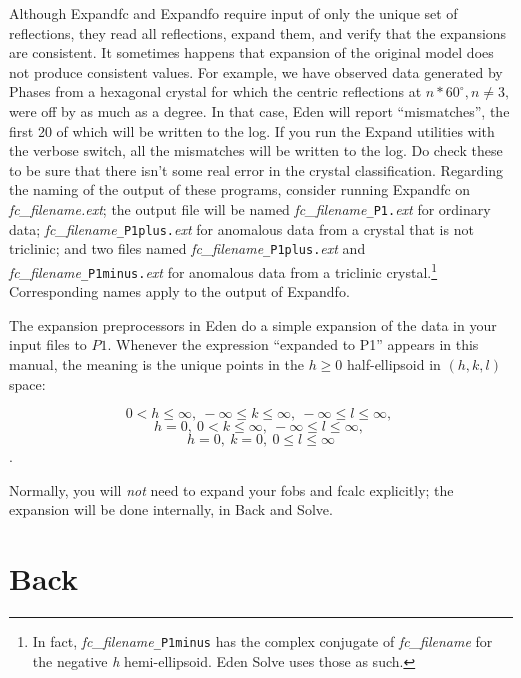 \documentclass{report}
\begin{document}
{Although Expandfc and Expandfo require input of
only the unique set of reflections, they read all reflections,
expand them, and verify that the expansions are consistent.  
It sometimes happens that expansion of the original model does not produce
consistent values.  For example, we have observed data generated by
Phases from a hexagonal crystal
for which the centric reflections at $n*60^\circ, n \neq 3,$
were off by as much as a degree.  In that case, Eden will report
``mismatches'', the first 20 of which will be written to the log.  
If you run the Expand utilities with the verbose switch, all the mismatches 
will be written to the log.
Do check these to be sure that there isn't some real error in the crystal
classification.  Regarding the naming of the output of these
programs, consider running Expandfc on {\it fc\_filename.ext}; 
the output file will be named {\it fc\_filename}{\tt \_P1.}{\it ext} for 
ordinary data; {\it fc\_filename}{\tt \_P1plus.}{\it ext} for anomalous data 
from a crystal that is not triclinic; 
and two files named {\it fc\_filename}{\tt \_P1plus.}{\it ext} and 
{\it fc\_filename}{\tt \_P1minus.}{\it ext} for anomalous data 
from a triclinic crystal.\footnote{ In fact, {\it fc\_filename}{\tt\_P1minus} has the 
complex conjugate of {\it fc\_filename} for the negative {\it h} hemi-ellipsoid.
Eden Solve uses those as such.}
Corresponding names apply to the output of Expandfo.

The expansion preprocessors in Eden do a simple expansion of the data in your
input files to $P1$. Whenever 
the expression ``expanded to P1'' appears in this manual, the meaning
is the unique points in the $h \geq 0$ half-ellipsoid in $(h,k,l)$ space: 

$$ 0 < h \leq \infty,~ -\infty \leq k \leq \infty,~ -\infty \leq l \leq \infty,~ $$
$$ h = 0,~ 0 < k \leq \infty,~ -\infty \leq l \leq \infty,~ $$ 
$$ h = 0,~ k = 0,~ 0 \leq l \leq \infty$$.

Normally, you will {\em not} need to expand your fobs and fcalc explicitly;
the expansion will be done internally, in Back and Solve.


\section {Back}
\label{preprocessors-back}

}
\end{document}
